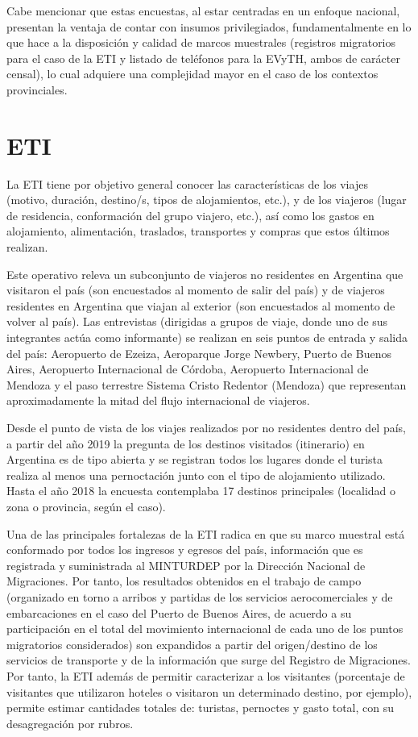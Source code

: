 \documentclass[
]{book}
\begin{document}
Cabe mencionar que estas encuestas, al estar centradas en un enfoque nacional, presentan la ventaja de contar con insumos privilegiados, fundamentalmente en lo que hace a la disposición y calidad de marcos muestrales (registros migratorios para el caso de la ETI y listado de teléfonos para la EVyTH, ambos de carácter censal), lo cual adquiere una complejidad mayor en el caso de los contextos provinciales.

\hypertarget{eti}{%
\section{ETI}\label{eti}}

La ETI tiene por objetivo general conocer las características de los viajes (motivo, duración, destino/s, tipos de alojamientos, etc.), y de los viajeros (lugar de residencia, conformación del grupo viajero, etc.), así como los gastos en alojamiento, alimentación, traslados, transportes y compras que estos últimos realizan.

Este operativo releva un subconjunto de viajeros no residentes en Argentina que visitaron el país (son encuestados al momento de salir del país) y de viajeros residentes en Argentina que viajan al exterior (son encuestados al momento de volver al país). Las entrevistas (dirigidas a grupos de viaje, donde uno de sus integrantes actúa como informante) se realizan en seis puntos de entrada y salida del país: Aeropuerto de Ezeiza, Aeroparque Jorge Newbery, Puerto de Buenos Aires, Aeropuerto Internacional de Córdoba, Aeropuerto Internacional de Mendoza y el paso terrestre Sistema Cristo Redentor (Mendoza) que representan aproximadamente la mitad del flujo internacional de viajeros.

Desde el punto de vista de los viajes realizados por no residentes dentro del país, a partir del año 2019 la pregunta de los destinos visitados (itinerario) en Argentina es de tipo abierta y se registran todos los lugares donde el turista realiza al menos una pernoctación junto con el tipo de alojamiento utilizado. Hasta el año 2018 la encuesta contemplaba 17 destinos principales (localidad o zona o provincia, según el caso).

Una de las principales fortalezas de la ETI radica en que su marco muestral está conformado por todos los ingresos y egresos del país, información que es registrada y suministrada al MINTURDEP por la Dirección Nacional de Migraciones. Por tanto, los resultados obtenidos en el trabajo de campo (organizado en torno a arribos y partidas de los servicios aerocomerciales y de embarcaciones en el caso del Puerto de Buenos Aires, de acuerdo a su participación en el total del movimiento internacional de cada uno de los puntos migratorios considerados) son expandidos a partir del origen/destino de los servicios de transporte y de la información que surge del Registro de Migraciones. Por tanto, la ETI además de permitir caracterizar a los visitantes (porcentaje de visitantes que utilizaron hoteles o visitaron un determinado destino, por ejemplo), permite estimar cantidades totales de: turistas, pernoctes y gasto total, con su desagregación por rubros.
\end{document}
